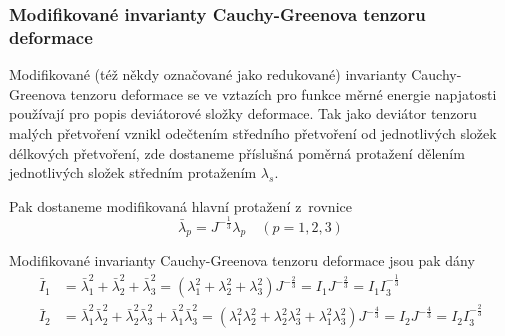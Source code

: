 
\subsubsection{Modifikované invarianty Cauchy-Greenova tenzoru deformace}
Modifikované (též někdy označované jako redukované) invarianty Cauchy-Greenova tenzoru deformace se ve vztazích pro funkce měrné energie napjatosti používají pro popis deviátorové složky deformace. Tak jako deviátor tenzoru malých přetvoření vznikl odečtením středního přetvoření od jednotlivých složek délkových přetvoření, zde dostaneme příslušná poměrná protažení dělením jednotlivých složek středním protažením $\lambda_s$. 

Pak dostaneme modifikovaná hlavní protažení z~rovnice
\begin{equation}
\bar{\lambda}_p = J^{-\frac{1}{3}} \lambda_p \quad (p = 1,2,3)
\end{equation}

Modifikované invarianty Cauchy-Greenova tenzoru deformace jsou pak dány
\begin{align}
\bar{I}_1
&= \bar{\lambda}_1^2 + \bar{\lambda}_2^2 + \bar{\lambda}_3^2
= \left(\lambda_1^2 + \lambda_2^2 + \lambda_3^2\right) J^{-\frac{2}{3}}
= I_1 J^{-\frac{2}{3}}
= I_1 I_3^{-\frac{1}{3}}\\
\bar{I}_2
&= \bar{\lambda}_1^2 \bar{\lambda}_2^2 + \bar{\lambda}_2^2 \bar{\lambda}_3^2 + \bar{\lambda}_1^2 \bar{\lambda}_3^2
= \left(\lambda_1^2 \lambda_2^2 + \lambda_2^2 \lambda_3^2 + \lambda_1^2 \lambda_3^2\right) J^{-\frac{4}{3}}
= I_2 J^{-\frac{4}{3}}
= I_2 I_3^{-\frac{2}{3}}
\end{align}
